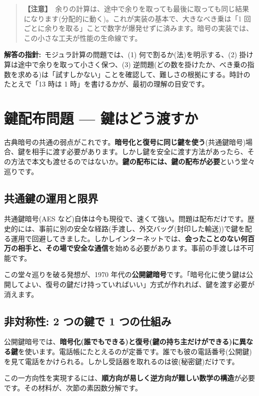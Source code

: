 \documentclass{article}
\begin{document}
\begin{quote}
\textbf{【注意】}\ 余りの計算は、途中で余りを取っても最後に取っても同じ結果になります(分配的に動く)。これが実装の基本で、大きなべき乗は「1 回ごとに余りを取る」ことで数字が爆発せずに済みます。暗号の実装では、この小さな工夫が性能の生命線です。
\end{quote}

\textbf{解答の指針:}\ モジュラ計算の問題では、(1) 何で割るか(法)を明示する、(2) 掛け算は途中で余りを取って小さく保つ、(3) 逆問題(どの数を掛けたか、べき乗の指数を求める)は「試すしかない」ことを確認して、難しさの根拠にする。時計のたとえで「13 時は 1 時」を書けるかが、最初の理解の目安です。

\section{鍵配布問題 — 鍵はどう渡すか}

古典暗号の共通の弱点がこれです。\textbf{暗号化と復号に同じ鍵を使う}(共通鍵暗号)場合、鍵を相手に渡す必要があります。しかし鍵を安全に渡す方法があったら、その方法で本文も渡せるのではないか。\textbf{鍵の配布には、鍵の配布が必要}という堂々巡りです。

\subsection{共通鍵の運用と限界}

共通鍵暗号(AES など)自体は今も現役で、速くて強い。問題は配布だけです。歴史的には、事前に別の安全な経路(手渡し、外交バッグ(封印した輸送))で鍵を配る運用で回避してきました。しかしインターネットでは、\textbf{会ったことのない何百万の相手と、その場で安全な通信}を始める必要があります。事前の手渡しは不可能です。

この堂々巡りを破る発想が、1970 年代の\textbf{公開鍵暗号}です。「暗号化に使う鍵は公開してよい、復号の鍵だけ持っていればいい」方式が作れれば、鍵を渡す必要が消えます。

\subsection{非対称性: 2 つの鍵で 1 つの仕組み}

公開鍵暗号では、\textbf{暗号化(誰でもできる)と復号(鍵の持ち主だけができる)に異なる鍵}を使います。電話帳にたとえるのが定番です。誰でも彼の電話番号(公開鍵)を見て電話をかけられる。しかし受話器を取れるのは彼(秘密鍵)だけです。

この一方向性を実現するには、\textbf{順方向が易しく逆方向が難しい数学の構造}が必要です。その材料が、次節の素因数分解です。
\end{document}
